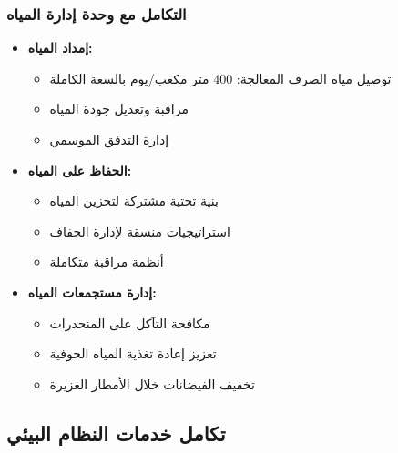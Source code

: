 \subsubsection{التكامل مع وحدة إدارة المياه}
\begin{itemize}
    \item \textbf{إمداد المياه:}
    \begin{itemize}
        \item توصيل مياه الصرف المعالجة: 400 متر مكعب/يوم بالسعة الكاملة
        \item مراقبة وتعديل جودة المياه
        \item إدارة التدفق الموسمي
    \end{itemize}
    \item \textbf{الحفاظ على المياه:}
    \begin{itemize}
        \item بنية تحتية مشتركة لتخزين المياه
        \item استراتيجيات منسقة لإدارة الجفاف
        \item أنظمة مراقبة متكاملة
    \end{itemize}
    \item \textbf{إدارة مستجمعات المياه:}
    \begin{itemize}
        \item مكافحة التآكل على المنحدرات
        \item تعزيز إعادة تغذية المياه الجوفية
        \item تخفيف الفيضانات خلال الأمطار الغزيرة
    \end{itemize}
\end{itemize}

\subsection{تكامل خدمات النظام البيئي}


